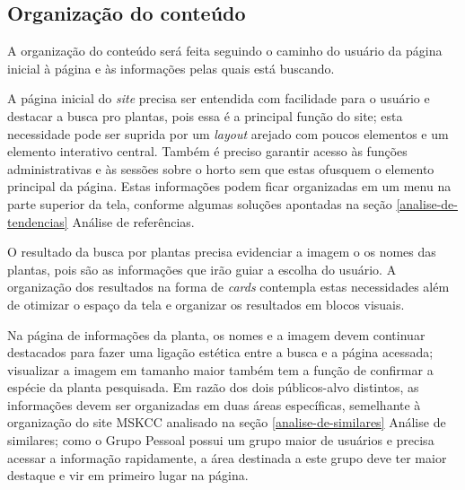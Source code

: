 \subsection{Organização do conteúdo}\label{organizacao-do-conteudo}

A organização do conteúdo será feita seguindo o caminho do usuário da página inicial à página e às informações pelas quais está buscando.

A página inicial do \emph{site} precisa ser entendida com facilidade para o usuário e destacar a busca pro plantas, pois essa é a principal função do site; esta necessidade pode ser suprida por um \emph{layout} arejado com poucos elementos e um elemento interativo central. Também é preciso garantir acesso às funções administrativas e às sessões sobre o horto sem que estas ofusquem o elemento principal da página. Estas informações podem ficar organizadas em um menu na parte superior da tela, conforme algumas soluções apontadas na seção \ref{analise-de-tendencias} Análise de referências.

O resultado da busca por plantas precisa evidenciar a imagem o os nomes das plantas, pois são as informações que irão guiar a escolha do usuário. A organização dos resultados na forma de \emph{cards} contempla estas necessidades além de otimizar o espaço da tela e organizar os resultados em blocos visuais.

Na página de informações da planta, os nomes e a imagem devem continuar destacados para fazer uma ligação estética entre a busca e a página acessada; visualizar a imagem em tamanho maior também tem a função de confirmar a espécie da planta pesquisada. Em razão dos dois públicos-alvo distintos, as informações devem ser organizadas em duas áreas específicas, semelhante à organização do site MSKCC analisado na seção \ref{analise-de-similares} Análise de similares; como o Grupo Pessoal possui um grupo maior de usuários e precisa acessar a informação rapidamente, a área destinada a este grupo deve ter maior destaque e vir em primeiro lugar na página.

